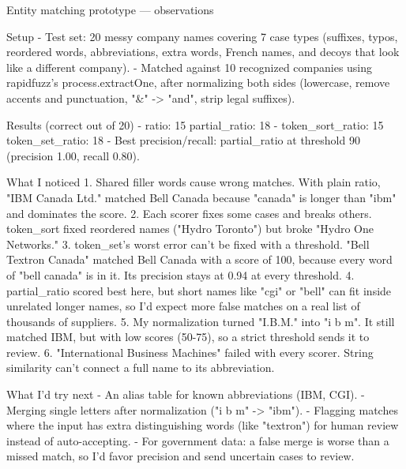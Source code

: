 Entity matching prototype — observations

Setup
- Test set: 20 messy company names covering 7 case types (suffixes,
  typos, reordered words, abbreviations, extra words, French names,
  and decoys that look like a different company).
- Matched against 10 recognized companies using rapidfuzz's
  process.extractOne, after normalizing both sides (lowercase, remove
  accents and punctuation, "&" -> "and", strip legal suffixes).

Results (correct out of 20)
- ratio: 15        partial_ratio: 18
- token_sort_ratio: 15   token_set_ratio: 18
- Best precision/recall: partial_ratio at threshold 90
  (precision 1.00, recall 0.80).

What I noticed
1. Shared filler words cause wrong matches. With plain ratio,
   "IBM Canada Ltd." matched Bell Canada because "canada" is longer
   than "ibm" and dominates the score.
2. Each scorer fixes some cases and breaks others. token_sort fixed
   reordered names ("Hydro Toronto") but broke "Hydro One Networks."
3. token_set's worst error can't be fixed with a threshold.
   "Bell Textron Canada" matched Bell Canada with a score of 100,
   because every word of "bell canada" is in it. Its precision stays
   at 0.94 at every threshold.
4. partial_ratio scored best here, but short names like "cgi" or
   "bell" can fit inside unrelated longer names, so I'd expect more
   false matches on a real list of thousands of suppliers.
5. My normalization turned "I.B.M." into "i b m". It still matched
   IBM, but with low scores (50-75), so a strict threshold sends it
   to review.
6. "International Business Machines" failed with every scorer.
   String similarity can't connect a full name to its abbreviation.

What I'd try next
- An alias table for known abbreviations (IBM, CGI).
- Merging single letters after normalization ("i b m" -> "ibm").
- Flagging matches where the input has extra distinguishing words
  (like "textron") for human review instead of auto-accepting.
- For government data: a false merge is worse than a missed match,
  so I'd favor precision and send uncertain cases to review.